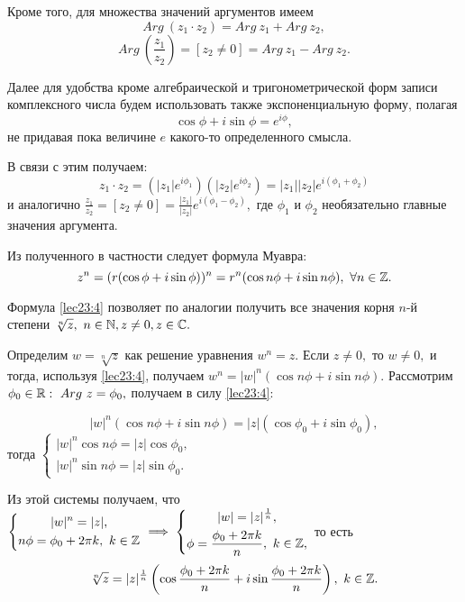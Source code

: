 \documentclass[../../main.tex]{subfiles}
\begin{document}
	Кроме того, для множества значений аргументов имеем 
	\[Arg\ (z_1\cdot z_2) = Arg\ z_1 + Arg\ z_2,\]
	\[Arg\ \left(\frac{z_1}{z_2}\right) =[z_2 \neq 0] = Arg\ z_1 - Arg\ z_2.\]
	
	Далее для удобства кроме алгебраической и тригонометрической форм записи
	комплексного числа будем использовать также экспоненциальную форму,
	полагая \[\cos \phi + i \sin\phi = e^{i\phi},\] не придавая пока
	величине $e$ какого-то определенного смысла.
	
	В связи с этим получаем:
	\[z_1\cdot z_2 = \left(|z_1| e^{i{\phi}_1}\right)
	\left(|z_2| e^{i{\phi}_2}\right) = |z_1||z_2| e^{i({\phi}_1+{\phi}_2)} \]
	и аналогично $\frac{z_1}{z_2} =  [z_2 \neq 0] = \frac{|z_1|}{|z_2|} 
	e^{i({\phi}_1-{\phi}_2)},$ где ${\phi}_1$ и ${\phi}_2$ необязательно 
	главные значения аргумента.
	
	Из полученного в частности следует формула Муавра:
	\begin{equation}
	\label{lec23:4}
	z^n = (r(\cos \phi + i\sin \phi))^n = r^n(\cos n\phi + i\sin n\phi),\
    \forall n\in \mathbb{Z}.
	\end{equation}
	
	Формула \eqref{lec23:4} позволяет по аналогии получить все значения корня
	$n$-й степени $\sqrt[n]{z},\ n\in\mathbb{N}, z\neq 0, z\in \mathbb{C}.$
	
	Определим $w = \sqrt[n]{z}$  как решение уравнения $w^n = z.$ Если 
	$z\neq 0,$ то $w\neq 0,$ и тогда, используя \eqref{lec23:4}, получаем
	$w^n = |w|^n(\cos n\phi + i\sin n\phi).$ Рассмотрим ${\phi}_0\in\mathbb{R}:\
	Arg\ z = {\phi}_0,$ получаем в силу  \eqref{lec23:4}:
	
	\begin{equation}
	\label{lec23:5}
	|w|^n (\cos n\phi + i\sin n\phi) = |z| (\cos {\phi}_0 + i\sin {\phi}_0),
	\end{equation}
	тогда $\left\{
	\begin{gathered} 
	|w|^n \cos n\phi =  |z| \cos {\phi}_0,\\
	|w|^n \sin n\phi  = |z| \sin {\phi}_0.
	\end{gathered}\right.$
	
	Из этой системы получаем, что $\left\{
	\begin{gathered} 
	|w|^n =  |z|,\\
	n\phi  = {\phi}_0 + 2\pi k,\ k\in\mathbb{Z}
	\end{gathered}\right. \implies \left\{
	\begin{gathered} 
	|w| =  |z|^{\frac{1}{n}},\\
	\phi  = \frac{{\phi}_0 + 2\pi k}{n},\ k\in\mathbb{Z},
	\end{gathered}\right.$ то есть \begin{equation}
	\label{lec23:6}
	\sqrt[n]{z} = |z|^{\frac{1}{n}}\left(\cos\frac{{\phi}_0 + 2\pi k}{n}
	 + i\sin \frac{{\phi}_0 + 2\pi k}{n} \right),\ k\in\mathbb{Z}.
	\end{equation}
	
\end{document}
